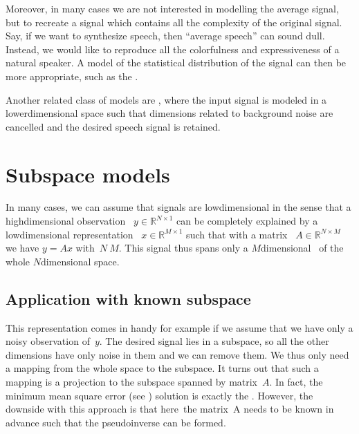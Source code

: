\documentclass[letterpaper,10pt,english]{jupyterBook}
\begin{document}
\sphinxAtStartPar
Moreover, in many cases we are not interested in modelling the average
signal, but to recreate a signal which contains all the complexity of
the original signal. Say, if we want to synthesize speech, then “average
speech” can sound dull. Instead, we would like to reproduce all the
colorfulness and expressiveness of a natural speaker. A model of the
statistical distribution of the signal can then be more appropriate,
such as the .

\sphinxAtStartPar
Another related class of models are {\hyperref[\detokenize{Modelling/Sub-space_models::doc}]{}}, where the input signal is modeled in a
lower\sphinxhyphen{}dimensional space such that dimensions related to background noise
are cancelled and the desired speech signal is retained.

\sphinxstepscope


\section{Sub\sphinxhyphen{}space models}
\label{\detokenize{Modelling/Sub-space_models:sub-space-models}}\label{\detokenize{Modelling/Sub-space_models::doc}}
\sphinxAtStartPar
In many cases, we can assume that signals are low\sphinxhyphen{}dimensional in the
sense that a high\sphinxhyphen{}dimensional observation  \( y\in{\mathbb
R}^{N\times 1} \) can be completely explained by a low\sphinxhyphen{}dimensional
representation  \( x\in{\mathbb R}^{M\times 1} \) such that with a
matrix  \( A\in{\mathbb R}^{N\times M} \) we have \( y = Ax \)
with \(N\>M\). This signal thus spans only a \(M\)\sphinxhyphen{}dimensional 
of the whole \(N\)\sphinxhyphen{}dimensional space.


\subsection{Application with known sub\sphinxhyphen{}space}
\label{\detokenize{Modelling/Sub-space_models:application-with-known-sub-space}}
\sphinxAtStartPar
This representation comes in handy for example if we assume that we have
only a noisy observation of \(y\). The desired signal lies in a sub\sphinxhyphen{}space,
so all the other dimensions have only noise in them and we can remove
them. We thus only need a mapping from the whole space to the sub\sphinxhyphen{}space.
It turns out that such a mapping is a projection to the sub\sphinxhyphen{}space
spanned by matrix \(A\). In fact, the minimum mean square error (see
{\hyperref[\detokenize{Modelling/Linear_regression::doc}]{}}) solution is exactly the
.
However, the downside with this approach is that here the matrix A needs
to be known in advance such that the pseudo\sphinxhyphen{}inverse can be formed.
\end{document}
